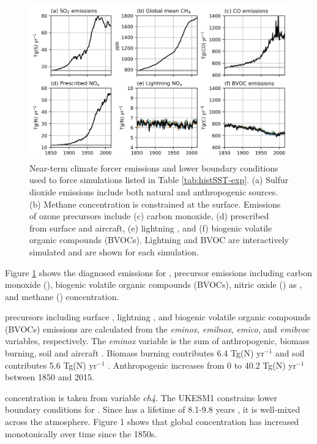 \begin{figure}
    \centering
    \includegraphics[width=\linewidth]{Chapter3/Figs/f01_emissions.png}
    \caption{Near-term climate forcer emissions and lower boundary conditions used to force simulations listed in Table \ref{tab:histSST-exp}. (a) Sulfur dioxide emissions include both natural and anthropogenic sources. (b) Methane concentration is constrained at the surface. Emissions of ozone precursors include (c) carbon monoxide, (d) prescribed  from surface and aircraft, (e) lightning , and (f) biogenic volatile organic compounds (BVOCs). Lightning   and BVOC are interactively simulated and are shown for each simulation.}
    \label{fig:emissions}
\end{figure}

Figure \ref{fig:emissions} shows the diagnosed emissions for ,  precursor emissions including carbon monoxide (), biogenic volatile organic compounds (BVOCs), nitric oxide () as , and methane () concentration. 

 precursors including surface , lightning ,  and biogenic volatile organic compounds (BVOCs) emissions are calculated from the \textit{eminox}, \textit{emilnox}, \textit{emico}, and \textit{emibvoc} variables, respectively. The \textit{eminox} variable is the sum of anthropogenic, biomass burning, soil and aircraft . Biomass burning contributes 6.4 Tg(N) yr$^{-1}$ and soil contributes 5.6 Tg(N) yr$^{-1}$ \citep{archibaldDescriptionEvaluationUKCA2020}. Anthropogenic  increases from 0 to 40.2 Tg(N) yr$^{-1}$ between 1850 and 2015. 

 concentration is taken from variable \textit{ch4}. The UKESM1 constrains lower boundary conditions for . Since  has a lifetime of 8.1-9.8 years \citep{oconnorAssessmentPreindustrialPresentday2021}, it is well-mixed across the atmosphere. Figure 1 shows that global  concentration has increased monotonically over time since the 1850s.

